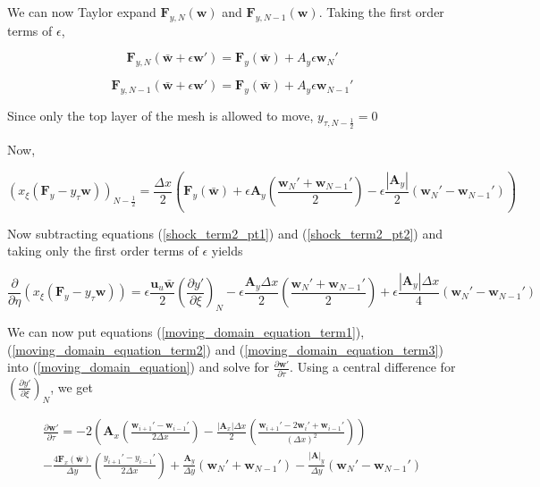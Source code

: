 \documentclass[10pt]{article}
\begin{document}
	We can now Taylor expand $\mathbf{F}_{y,N}(\mathbf{w})$ and $\mathbf{F}_{y,N-1}(\mathbf{w})$. Taking the first order terms of $\epsilon$,
	
	$$ \mathbf{F}_{y,N}(\bar{\mathbf{w}} + \epsilon \mathbf{w}') = \mathbf{F}_{y}(\bar{\mathbf{w}}) + A_y \epsilon \mathbf{w}_N' $$
	
	$$ \mathbf{F}_{y,N-1}(\bar{\mathbf{w}} + \epsilon \mathbf{w}') = \mathbf{F}_{y}(\bar{\mathbf{w}}) + A_y \epsilon \mathbf{w}_{N-1}' $$
	
	Since only the top layer of the mesh is allowed to move, $y_{\tau,N-\frac{1}{2}}=0$
	
	Now,
	
	\begin{equation} \label{shock_term2_pt2}
		(x_\xi (\mathbf{F}_y - y_\tau \mathbf{w}))_{N-\frac{1}{2}} = \frac{\Delta x}{2} \left( \mathbf{F}_{y}(\bar{\mathbf{w}}) + \epsilon \mathbf{A}_y \left( \frac{\mathbf{w}_N' + \mathbf{w}_{N-1}'}{2}\right) - \epsilon \frac{|\mathbf{A}_y|}{2} ( \mathbf{w}_N' - \mathbf{w}_{N-1}') \right)
	\end{equation}
	
	Now subtracting  equations (\ref{shock_term2_pt1}) and (\ref{shock_term2_pt2}) and taking only the first order terms of $\epsilon$ yields
	
	\begin{equation} \label{moving_domain_equation_term3}
		\frac{\partial}{\partial \eta} (x_\xi (\mathbf{F}_y - y_\tau \mathbf{w})) = 
		\epsilon \frac{\mathbf{u}_u \bar{\mathbf{w}}}{2} \left( \frac{\partial y'}{\partial \xi} \right)_N 
		- \epsilon \frac{\mathbf{A}_y \Delta x}{2} \left( \frac{\mathbf{w}_N' + \mathbf{w}_{N-1}'}{2} \right) 
		+ \epsilon \frac{|\mathbf{A}_y| \Delta x}{4} ( \mathbf{w}_N' - \mathbf{w}_{N-1}')
	\end{equation}
	
	We can now put equations (\ref{moving_domain_equation_term1}), (\ref{moving_domain_equation_term2}) and (\ref{moving_domain_equation_term3}) into (\ref{moving_domain_equation}) and solve for $\frac{\partial \mathbf{w}'}{\partial \tau}$. Using a central difference for $\left( \frac{\partial y'}{\partial \xi} \right)_N $, we get
		
	\begin{multline}
		\frac{\partial \mathbf{w}'}{\partial \tau} = 
		- 2 \left( \mathbf{A}_x \left( \frac{\mathbf{w}_{i+1}' - \mathbf{w}_{i-1}'}{2 \Delta x}\right) - \frac{|\mathbf{A}_x| \Delta x}{2} \left( \frac{\mathbf{w}_{i+1}' - 2 \mathbf{w}_i' + \mathbf{w}_{i-1}'}{(\Delta x)^2} \right) \right)
		\\ - \frac{4 \mathbf{F}_{x}(\bar{\mathbf{w}})}{\Delta y}    \left( \frac{y_{i+1}' - y_{i-1}'}{2 \Delta x} \right)
		+ \frac{\mathbf{A}_y}{\Delta y} (\mathbf{w}_N' + \mathbf{w}_{N-1}')
		- \frac{|\mathbf{A}|_y}{\Delta y} (\mathbf{w}_N' - \mathbf{w}_{N-1}')
	\end{multline}
	
\end{document}
